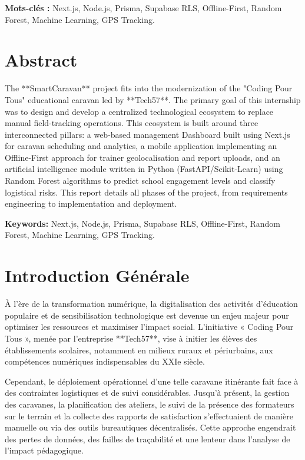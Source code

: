 \documentclass[12pt,a4paper]{report}
\begin{document}
\textbf{Mots-clés :} Next.js, Node.js, Prisma, Supabase RLS, Offline-First, Random Forest, Machine Learning, GPS Tracking.

\chapter*{Abstract}
The **SmartCaravan** project fits into the modernization of the "Coding Pour Tous" educational caravan led by **Tech57**. The primary goal of this internship was to design and develop a centralized technological ecosystem to replace manual field-tracking operations. This ecosystem is built around three interconnected pillars: a web-based management Dashboard built using Next.js for caravan scheduling and analytics, a mobile application implementing an Offline-First approach for trainer geolocalisation and report uploads, and an artificial intelligence module written in Python (FastAPI/Scikit-Learn) using Random Forest algorithms to predict school engagement levels and classify logistical risks. This report details all phases of the project, from requirements engineering to implementation and deployment.

\textbf{Keywords:} Next.js, Node.js, Prisma, Supabase RLS, Offline-First, Random Forest, Machine Learning, GPS Tracking.

\newpage
\tableofcontents
\listoffigures
\listoftables

\newpage

\chapter*{Introduction Générale}

À l'ère de la transformation numérique, la digitalisation des activités d'éducation populaire et de sensibilisation technologique est devenue un enjeu majeur pour optimiser les ressources et maximiser l'impact social. L'initiative « Coding Pour Tous », menée par l'entreprise **Tech57**, vise à initier les élèves des établissements scolaires, notamment en milieux ruraux et périurbains, aux compétences numériques indispensables du XXIe siècle.

Cependant, le déploiement opérationnel d'une telle caravane itinérante fait face à des contraintes logistiques et de suivi considérables. Jusqu'à présent, la gestion des caravanes, la planification des ateliers, le suivi de la présence des formateurs sur le terrain et la collecte des rapports de satisfaction s'effectuaient de manière manuelle ou via des outils bureautiques décentralisés. Cette approche engendrait des pertes de données, des failles de traçabilité et une lenteur dans l'analyse de l'impact pédagogique.
\end{document}
